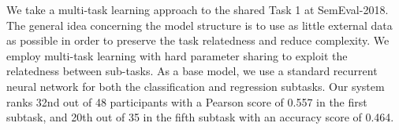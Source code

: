 We take a multi-task learning approach to the shared Task 1 at SemEval-2018. The general idea concerning the model structure is to use as little external data as possible in order to preserve the task relatedness and reduce complexity. We employ multi-task learning with hard parameter sharing to exploit the relatedness between sub-tasks. As a base model, we use a standard recurrent neural network for both the classification and regression subtasks. Our system ranks 32nd out of 48 participants with a Pearson score of 0.557 in the first subtask, and 20th out of 35 in the fifth subtask with an accuracy score of 0.464.
